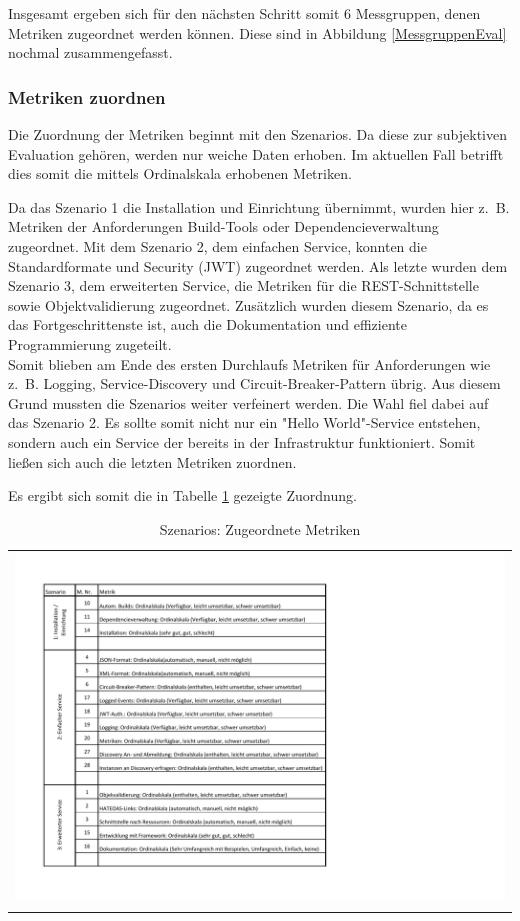 Insgesamt ergeben sich für den nächsten Schritt somit 6 Messgruppen, denen Metriken zugeordnet werden können.
Diese sind in Abbildung \ref{MessgruppenEval} nochmal zusammengefasst.


\subsubsection{Metriken zuordnen}

Die Zuordnung der Metriken beginnt mit den Szenarios. Da diese zur subjektiven Evaluation gehören, werden nur weiche Daten erhoben. Im aktuellen Fall betrifft dies somit die mittels Ordinalskala erhobenen Metriken.

Da das Szenario 1 die Installation und Einrichtung übernimmt, wurden hier z.~B. Metriken der Anforderungen Build-Tools oder Dependencieverwaltung zugeordnet. Mit dem Szenario 2, dem einfachen Service, konnten die Standardformate und Security (\ac{JWT}) zugeordnet werden. Als letzte wurden dem Szenario 3, dem erweiterten Service, die Metriken für die \ac{REST}-Schnittstelle sowie Objektvalidierung zugeordnet. Zusätzlich wurden diesem Szenario, da es das Fortgeschrittenste ist, auch die Dokumentation und effiziente Programmierung zugeteilt.\\
Somit blieben am Ende des ersten Durchlaufs Metriken für Anforderungen wie z.~B. Logging, Service-Discovery und Circuit-Breaker-Pattern übrig. Aus diesem Grund mussten die Szenarios weiter verfeinert werden. Die Wahl fiel dabei auf das Szenario 2. Es sollte somit nicht nur ein "Hello World"-Service entstehen, sondern auch ein Service der bereits in der Infrastruktur funktioniert. Somit ließen sich auch die letzten Metriken zuordnen. 

Es ergibt sich somit die in Tabelle \ref{SzMetriken} gezeigte Zuordnung.  

\begin{longtable}{c}
	\includegraphics[width=\linewidth]{Bilder/SzMetriken.pdf} \\	
	\caption[Metriken Szenarios]{Szenarios: Zugeordnete Metriken}
	\label{SzMetriken}\\
\end{longtable}
\FloatBarrier

